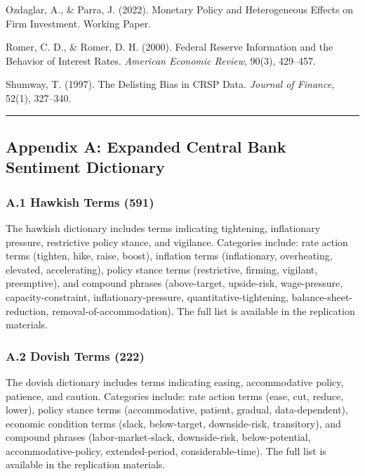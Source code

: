 \documentclass[
]{article}
\begin{document}
Ozdaglar, A., \& Parra, J. (2022). Monetary Policy and Heterogeneous
Effects on Firm Investment. Working Paper.

Romer, C. D., \& Romer, D. H. (2000). Federal Reserve Information and
the Behavior of Interest Rates. \emph{American Economic Review}, 90(3),
429--457.

Shumway, T. (1997). The Delisting Bias in CRSP Data. \emph{Journal of
Finance}, 52(1), 327--340.

\begin{center}\rule{0.5\linewidth}{0.5pt}\end{center}

\subsection{Appendix A: Expanded Central Bank Sentiment
Dictionary}\label{appendix-a-expanded-central-bank-sentiment-dictionary}

\subsubsection{A.1 Hawkish Terms (591)}\label{a.1-hawkish-terms-591}

The hawkish dictionary includes terms indicating tightening,
inflationary pressure, restrictive policy stance, and vigilance.
Categories include: rate action terms (tighten, hike, raise, boost),
inflation terms (inflationary, overheating, elevated, accelerating),
policy stance terms (restrictive, firming, vigilant, preemptive), and
compound phrases (above-target, upside-risk, wage-pressure,
capacity-constraint, inflationary-pressure, quantitative-tightening,
balance-sheet-reduction, removal-of-accommodation). The full list is
available in the replication materials.

\subsubsection{A.2 Dovish Terms (222)}\label{a.2-dovish-terms-222}

The dovish dictionary includes terms indicating easing, accommodative
policy, patience, and caution. Categories include: rate action terms
(ease, cut, reduce, lower), policy stance terms (accommodative, patient,
gradual, data-dependent), economic condition terms (slack, below-target,
downside-risk, transitory), and compound phrases (labor-market-slack,
downside-risk, below-potential, accommodative-policy, extended-period,
considerable-time). The full list is available in the replication
materials.
\end{document}
